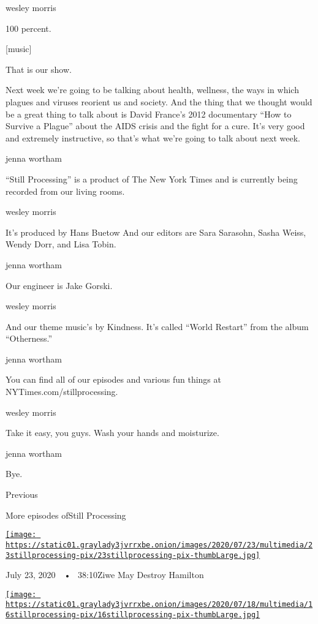 wesley morris

100 percent.

{[}music{]}

That is our show.

Next week we're going to be talking about health, wellness, the ways in
which plagues and viruses reorient us and society. And the thing that we
thought would be a great thing to talk about is David France's 2012
documentary ``How to Survive a Plague'' about the AIDS crisis and the
fight for a cure. It's very good and extremely instructive, so that's
what we're going to talk about next week.

jenna wortham

``Still Processing'' is a product of The New York Times and is currently
being recorded from our living rooms.

wesley morris

It's produced by Hans Buetow And our editors are Sara Sarasohn, Sasha
Weiss, Wendy Dorr, and Lisa Tobin.

jenna wortham

Our engineer is Jake Gorski.

wesley morris

And our theme music's by Kindness. It's called ``World Restart'' from
the album ``Otherness.''

jenna wortham

You can find all of our episodes and various fun things at
NYTimes.com/stillprocessing.

wesley morris

Take it easy, you guys. Wash your hands and moisturize.

jenna wortham

Bye.

Previous

More episodes ofStill Processing

\href{https://www.nytimes3xbfgragh.onion/2020/07/23/podcasts/hamilton-ziwe-discomfort.html?action=click\&module=audio-series-bar\&region=header\&pgtype=Article}{\texttt{[image: https://static01.graylady3jvrrxbe.onion/images/2020/07/23/multimedia/23stillprocessing-pix/23stillprocessing-pix-thumbLarge.jpg]}}

July 23, 2020~~•~ 38:10Ziwe May Destroy Hamilton

\href{https://www.nytimes3xbfgragh.onion/2020/07/16/podcasts/reparations-for-aunt-jemima.html?action=click\&module=audio-series-bar\&region=header\&pgtype=Article}{\texttt{[image: https://static01.graylady3jvrrxbe.onion/images/2020/07/18/multimedia/16stillprocessing-pix/16stillprocessing-pix-thumbLarge.jpg]}}

